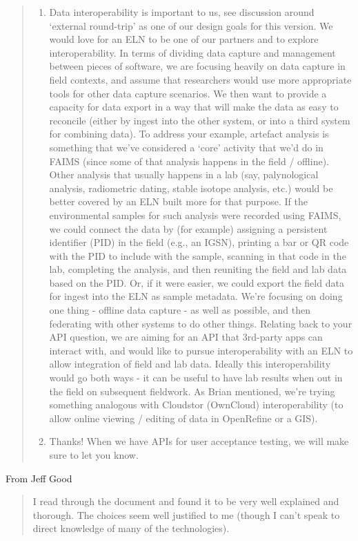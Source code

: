 \documentclass[a4paper,headings=small fontsize=10pt]{scrreprt}
\begin{document}
\begin{quote}
\begin{enumerate}[itemsep=1em]
\item Data interoperability is important to us, see discussion around `external
  round-trip' as one of our design goals for this version. We would love
  for an ELN to be one of our partners and to explore interoperability. In 
  terms of dividing data capture and management between pieces of software, we 
  are focusing heavily on data capture in field contexts, and assume that 
  researchers would use more appropriate tools for other data capture scenarios.
  We then want to provide a capacity for data export in a way that will make the 
  data as easy to reconcile (either by ingest into the other system, or into a third
  system for combining data). To address your example, artefact analysis is something that we've 
  considered a `core' activity that we'd do in FAIMS (since some of that analysis happens in 
  the field / offline). Other analysis that usually happens in a lab (say, palynological 
  analysis, radiometric dating, stable isotope analysis, etc.) would be better covered by an ELN
  built more for that purpose. If the environmental samples for such analysis were recorded
  using FAIMS, we could connect the data by (for example) assigning a persistent identifier (PID) in the 
  field (e.g., an IGSN), printing a bar or QR code with the PID to include with the sample, scanning 
  in that code in the lab, completing the analysis, and then reuniting the field and lab data based 
  on the PID. Or, if it were easier, we could export the field data for ingest into the ELN 
  as sample metadata. We're focusing on doing one thing - offline data capture - as well as possible, 
  and then federating with other systems to do other things. Relating back to your API question, 
  we are aiming for an API that 3rd-party apps can interact with, and would like to pursue 
  interoperability with an ELN to allow integration of field and lab data. Ideally this 
  interoperability would go both ways - it can be useful to have lab results when out 
  in the field on subsequent fieldwork. As Brian mentioned, we're trying something 
  analogous with Cloudstor (OwnCloud) interoperability (to allow online viewing / 
  editing of data in OpenRefine or a GIS).
 
\item Thanks! When we have APIs for user acceptance testing, we will make
  sure to let you know.
 
\end{enumerate}
\end{quote}
From Jeff Good
\begin{quote}
I read through the document and found it to be very well explained and
thorough. The choices seem well justified to me (though I can't speak to
direct knowledge of many of the technologies).
\end{quote}
\end{document}
